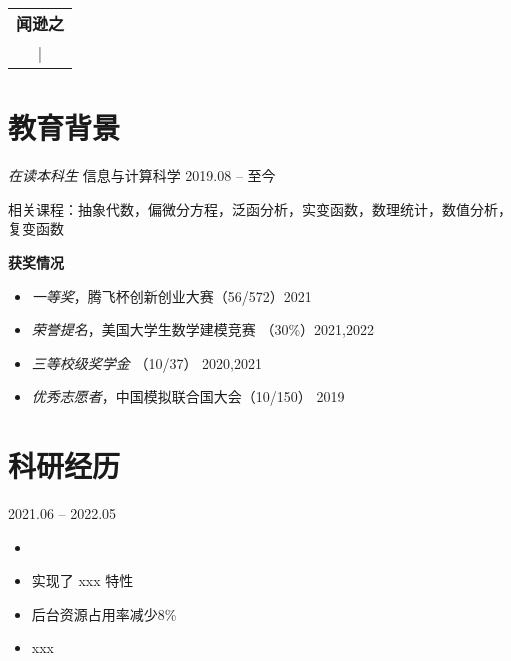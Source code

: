 \documentclass{resume}
\begin{document}
\begin{table}
  \centering
  \Large{
  \begin{tabu}{ c }
    \centering
    \textbf{\huge{闻逊之}}   \\
     |  \\
  \end{tabu}
}
\end{table}

\vspace{2pt}
\section{教育背景}
\textit{在读本科生} \quad 信息与计算科学 \hfill{2019.08 -- 至今}

相关课程：抽象代数，偏微分方程，泛函分析，实变函数，数理统计，数值分析，复变函数

\textbf{获奖情况}
\begin{itemize}
  \item \textit{一等奖}，腾飞杯创新创业大赛（56/572）\hfill 2021
  \item \textit{荣誉提名}，美国大学生数学建模竞赛 （30\%）\hfill 2021,2022
  \item \textit{三等校级奖学金} （10/37） \hfill 2020,2021
  \item \textit{优秀志愿者}，中国模拟联合国大会（10/150） \hfill 2019
\end{itemize}

\section{科研经历}
 \begin{flushright}
  2021.06 -- 2022.05
\end{flushright}

\begin{itemize}
  \item 
\end{itemize}
\begin{itemize}
  \item 实现了 xxx 特性
  \item 后台资源占用率减少8\%
  \item xxx
\end{itemize}
\end{document}
